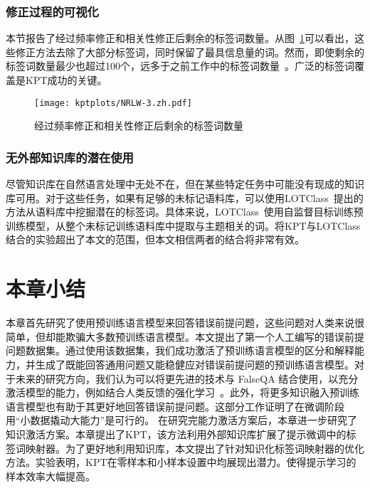 \subsubsection{修正过程的可视化}
\label{app:remainwords}
本节报告了经过频率修正和相关性修正后剩余的标签词数量。从图~\ref{fig:remainwords}可以看出，这些修正方法去除了大部分标签词，同时保留了最具信息量的词。然而，即使剩余的标签词数量最少也超过100个，远多于之前工作中的标签词数量~\cite{schick2020automatically}。广泛的标签词覆盖是KPT成功的关键。

\begin{figure}[!htbp]
    \centering
    \texttt{[image: kptplots/NRLW-3.zh.pdf]}
    \caption{经过频率修正和相关性修正后剩余的标签词数量}
    \label{fig:remainwords}
\end{figure}

\subsubsection{无外部知识库的潜在使用}
\label{withoutkb}
尽管知识库在自然语言处理中无处不在，但在某些特定任务中可能没有现成的知识库可用。对于这些任务，如果有足够的未标记语料库，可以使用LOTClass~\cite{meng2020text}提出的方法从语料库中挖掘潜在的标签词。具体来说，LOTClass~\cite{meng2020text}使用自监督目标训练预训练模型，从整个未标记训练语料库中提取与主题相关的词。将KPT与LOTClass结合的实验超出了本文的范围，但本文相信两者的结合将非常有效。

\section{本章小结}


本章首先研究了使用预训练语言模型来回答错误前提问题，这些问题对人类来说很简单，但却能欺骗大多数预训练语言模型。本文提出了第一个人工编写的错误前提问题数据集。通过使用该数据集，我们成功激活了预训练语言模型的区分和解释能力，并生成了既能回答通用问题又能稳健应对错误前提问题的预训练语言模型。对于未来的研究方向，我们认为可以将更先进的技术与 FalseQA 结合使用，以充分激活模型的能力，例如结合人类反馈的强化学习~\cite{ouyang2022training}。此外，将更多知识融入预训练语言模型也有助于其更好地回答错误前提问题。这部分工作证明了在微调阶段用“小数据撬动大能力”是可行的。
在研究完能力激活方案后，本章进一步研究了知识激活方案。本章提出了KPT，该方法利用外部知识库扩展了提示微调中的标签词映射器。为了更好地利用知识库，本文提出了针对知识化标签词映射器的优化方法。实验表明，KPT在零样本和小样本设置中均展现出潜力。使得提示学习的样本效率大幅提高。

